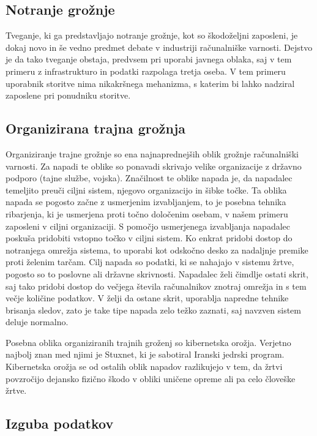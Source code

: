 \documentclass[12pt,a4paper,openany,tikz]{book}
\theoremstyle{plain}
\theoremstyle{definition}
\begin{document}
\subsection{Notranje grožnje}
\label{sub:Notranje grožnje}

Tveganje, ki ga predstavljajo notranje grožnje, kot so škodoželjni zaposleni, je dokaj novo in še vedno predmet debate v industriji računalniške varnosti. Dejstvo je da tako tveganje obstaja, predvsem pri uporabi javnega oblaka, saj v tem primeru z infrastrukturo in podatki razpolaga tretja oseba. V tem primeru uporabnik storitve nima nikakršnega mehanizma, s katerim bi lahko nadziral zaposlene pri ponudniku storitve.

\subsection{Organizirana trajna grožnja}
\label{sub:Organizirana trajna grožnja}

Organiziranje trajne grožnje so ena najnaprednejših oblik grožnje računalniški varnosti. Za napadi te oblike so ponavadi skrivajo velike organizacije z državno podporo (tajne službe, vojska). Značilnost te oblike napada je, da napadalec temeljito preuči ciljni sistem, njegovo organizacijo in šibke točke. Ta oblika napada se pogosto začne z usmerjenim izvabljanjem, to je posebna tehnika ribarjenja, ki je usmerjena proti točno določenim osebam, v našem primeru zaposleni v ciljni organizaciji. S pomočjo usmerjenega izvabljanja napadalec poskuša pridobiti vstopno točko v ciljni sistem. Ko enkrat pridobi dostop do notranjega omrežja sistema, to uporabi kot odskočno desko za nadaljnje premike proti želenim tarčam. Cilj napada so podatki, ki se nahajajo v sistemu žrtve, pogosto so to poslovne ali državne skrivnosti. Napadalec želi čimdlje ostati skrit, saj tako pridobi dostop do večjega števila računalnikov znotraj omrežja in s tem večje količine podatkov. V želji da ostane skrit, uporablja napredne tehnike brisanja sledov, zato je take tipe napada zelo težko zaznati, saj navzven sistem deluje normalno.

Posebna oblika organiziranih trajnih groženj so kibernetska orožja. Verjetno najbolj znan med njimi je Stuxnet, ki je sabotiral Iranski jedrski program. Kibernetska orožja se od ostalih oblik napadov razlikujejo v tem, da žrtvi povzročijo dejansko fizično škodo v obliki uničene opreme ali pa celo človeške žrtve.

\subsection{Izguba podatkov}
\label{sub:Izguba podatkov}
\end{document}
